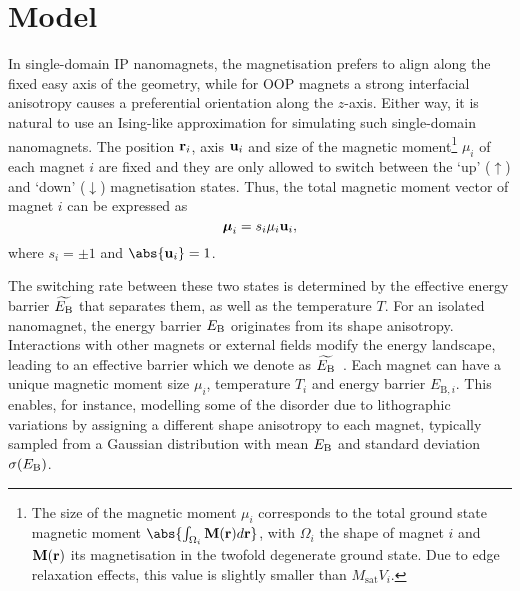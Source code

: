 \section{Model}
In single-domain IP nanomagnets, the magnetisation prefers to align along the fixed easy axis of the geometry, while for OOP magnets a strong interfacial anisotropy causes a preferential orientation along the $z$-axis.
Either way, it is natural to use an Ising-like approximation for simulating such single-domain nanomagnets.
The position $\boldsymbol{\mathbf{r}}_i$, axis $\boldsymbol{\mathbf{u}}_i$ and size of the magnetic moment\footnote{
	\label{fn:2:moment_integral}
	The size of the magnetic moment $\mu_i$ corresponds to the total ground state magnetic moment $\abs{\int_{\Omega_i} \vc{M}(\vc{r})d\vc{r}}$, with $\Omega_i$ the shape of magnet $i$ and $\boldsymbol{\mathbf{M}}(\boldsymbol{\mathbf{r}})$ its magnetisation in the twofold degenerate ground state. Due to edge relaxation effects, this value is slightly smaller than $M_\mathrm{sat} V_i$.
} $\mu_i$ of each magnet $i$ are fixed and they are only allowed to switch between the `up' ($\uparrow$) and `down' ($\downarrow$) magnetisation states.
Thus, the total magnetic moment vector of magnet $i$ can be expressed as
\begin{equation}
	\boldsymbol{\mathbf{\mu}}_i = s_i \mu_i \boldsymbol{\mathbf{u}}_i \mathrm{,}
\end{equation}
where $s_i = \pm 1$ and $\abs{\vc{u}_i} = 1$. \par
The switching rate between these two states is determined by the effective energy barrier $\widetilde{E_\mathrm{B}}$ that separates them, as well as the temperature $T$.
For an isolated nanomagnet, the energy barrier $E_\mathrm{B}$ originates from its shape anisotropy.
Interactions with other magnets or external fields modify the energy landscape, leading to an effective barrier which we denote as $\widetilde{E_\mathrm{B}}$~\cite{leo2021chiral}.
Each magnet can have a unique magnetic moment size $\mu_i$, temperature $T_i$ and energy barrier $E_{\mathrm{B},i}$.
This enables, for instance, modelling some of the disorder due to lithographic variations by assigning a different shape anisotropy to each magnet, typically sampled from a Gaussian distribution with mean $E_\mathrm{B}$ and standard deviation $\sigma(E_\mathrm{B})$. \\\par

